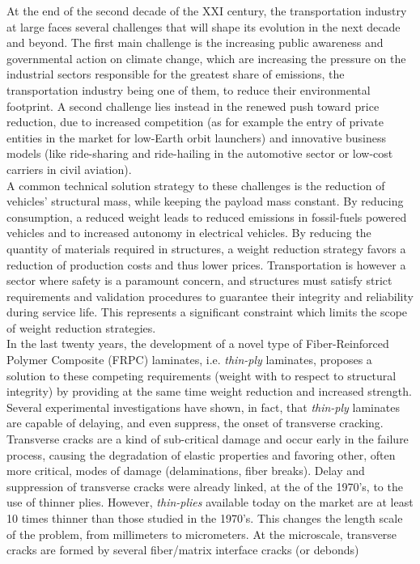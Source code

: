 At the end of the second decade of the XXI century, the transportation industry at large faces several challenges that will shape its evolution in the next decade and beyond. The first main challenge is the increasing public awareness and governmental action on climate change, which are increasing the pressure on the industrial sectors responsible for the greatest share of emissions, the transportation industry being one of them, to reduce their environmental footprint. A second challenge lies instead in the renewed push toward price reduction, due to increased competition (as for example the entry of private entities in the market for low-Earth orbit launchers) and innovative business models (like ride-sharing and ride-hailing in the automotive sector or low-cost carriers in civil aviation).\\
A common technical solution strategy to these challenges is the reduction of vehicles' structural mass, while keeping the payload mass constant. By reducing consumption, a reduced weight leads to reduced emissions in fossil-fuels powered vehicles and to increased autonomy in electrical vehicles. By reducing the quantity of materials required in structures, a weight reduction strategy favors a reduction of production costs and thus lower prices. Transportation is however a sector where safety is a paramount concern, and structures must satisfy strict requirements and validation procedures to guarantee their integrity and reliability during service life. This represents a significant constraint which limits the scope of weight reduction strategies.\\
In the last twenty years, the development of a novel type of Fiber-Reinforced Polymer Composite (FRPC) laminates, i.e. \emph{thin-ply} laminates, proposes a solution to these competing requirements (weight with to respect to structural integrity) by providing at the same time weight reduction and increased strength. Several experimental investigations have shown, in fact, that \emph{thin-ply} laminates are capable of delaying, and even suppress, the onset of transverse cracking. Transverse cracks are a kind of sub-critical damage and occur early in the failure process, causing the degradation of elastic properties and favoring other, often more critical, modes of damage (delaminations, fiber breaks). Delay and suppression of transverse cracks were already linked, at the of the 1970's, to the use of thinner plies. However, \emph{thin-plies} available today on the market are at least 10 times thinner than those studied in the 1970's. This changes the length scale of the problem, from millimeters to micrometers. At the microscale, transverse cracks are formed by several fiber/matrix interface cracks (or debonds) 

